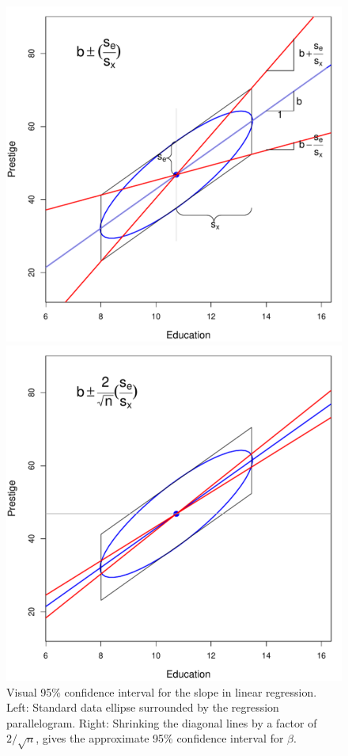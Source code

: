 \begin{figure}[htb]
  \begin{minipage}[c]{.49\textwidth}
   \includegraphics[width=1\linewidth,clip]{fig/vis-reg-prestige1}
   \end{minipage}%
  \hfill
  \begin{minipage}[c]{.49\textwidth}
   \includegraphics[width=1\linewidth,clip]{fig/vis-reg-prestige2}
  \end{minipage}
  \caption{Visual 95\% confidence interval for the slope in linear regression. Left: Standard data ellipse surrounded by the
  regression parallelogram. Right: Shrinking the diagonal lines by a factor of $2/\sqrt{n}$,
  gives the approximate 95\% confidence interval for $\beta$.}%
  \label{vis-reg-prestige}
\end{figure}

